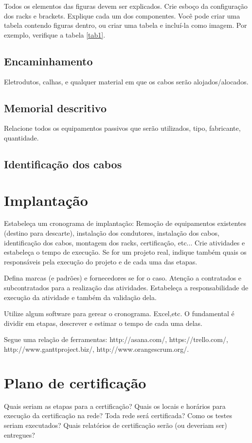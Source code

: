 \documentclass[	DIV=calc,%
							paper=a4,%
							fontsize=12pt,%
							onecolumn]{scrartcl}	 					%
\begin{document}
Todos os elementos das figuras devem ser explicados. 
Crie esboço da configuração dos racks e brackets. Explique cada um dos componentes. Você pode criar uma tabela contendo figuras dentro, ou criar uma tabela e incluí-la como imagem. Por exemplo, verifique a tabela \ref{tab1}.


\subsection{Encaminhamento}
Eletrodutos, calhas, e qualquer material em que os cabos serão alojados/alocados.

\subsection{Memorial descritivo}

Relacione todos os equipamentos passivos que serão utilizados, tipo, fabricante, quantidade.

\subsection{Identificação dos cabos}

\section{Implantação}
Estabeleça um cronograma de implantação:
Remoção de equipamentos existentes (destino para descarte), instalação dos condutores, instalação dos cabos, 
identificação dos cabos, montagem dos racks, certificação, etc... Crie atividades e estabeleça o tempo de execução. Se for um projeto real, indique também quais os responsáveis pela execução do projeto e de cada uma das etapas.

Defina marcas (e padrões) e fornecedores se for o caso. Atenção a contratados e subcontratados para a realização das atividades. Estabeleça a responsabilidade de execução da atividade e também da validação dela.

Utilize algum software para gerear o cronograma. Excel,etc. O fundamental é dividir em etapas, descrever e estimar o tempo de cada uma delas.

Segue uma relação de ferramentas:
http://asana.com/, 
https://trello.com/, 
http://www.ganttproject.biz/, 
http://www.orangescrum.org/. 

\section{Plano de certificação}
Quais seriam as etapas para a certificação? 
Quais os locais e horários para execução da certificação na rede? Toda rede será certificada?
Como os testes seriam executados?
Quais relatórios de certificação serão (ou deveriam ser) entregues? 
\end{document}
